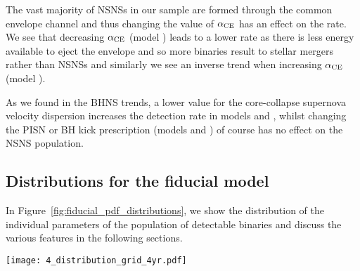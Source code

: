 The vast majority of NSNSs in our sample are formed through the common envelope channel and thus changing the value of $\alpha_{\rm CE}$ has an effect on the rate. We see that decreasing $\alpha_{\rm CE}$ (model \modAlphaLow) leads to a lower rate as there is less energy available to eject the envelope and so more binaries result to stellar mergers rather than NSNSs and similarly we see an inverse trend when increasing $\alpha_{\rm CE}$ (model \modAlphaHigh).

As we found in the BHNS trends, a lower value for the core-collapse supernova velocity dispersion increases the detection rate in models \modSigLow{} and \modSigLower{}, whilst changing the PISN or BH kick prescription (models \modNoPISN{} and \modNoBH{}) of course has no effect on the NSNS population.

\subsection{Distributions for the fiducial model}\label{sec:fiducial_distributions}

In Figure~\ref{fig:fiducial_pdf_distributions}, we show the distribution of the individual parameters of the population of detectable binaries and discuss the various features in the following sections.

\begin{figure*}[htbp]
    \centering
    \texttt{[image: 4\_distribution\_grid\_4yr.pdf]}
    \caption{Distributions for various parameters of the DCOs that are detectable in a 4 year LISA mission in our fiducial model. Each panel shows the distribution of a single parameter, where the colour denotes the DCO type. We also plot the 1- and 2-$\sigma$ uncertainties (obtained via bootstrapping) with the dark and light shaded areas respectively. The first two rows (excluding metallicity) use kernel density estimators to show the distributions. The dotted lines in the black hole mass panel show the individual distributions of the primary and secondary masses. The metallicity panel shows the distribution over the metallicity bins used in our population synthesis, which we show in the grid lines. The final three panels for the cumulative distribution functions for observables, normalised to the expected number of fiducial detections in a four year LISA mission. The dark shaded areas indicate regimes in which the quantity cannot be measured. The dotted lines in the angular resolution plot show the maximum angular resolution that can be covered by a single pointing of the labelled instrument. In Section~\ref{sec:fiducial_distributions} we discuss the features of the distributions.}
    \label{fig:fiducial_pdf_distributions}
\end{figure*}

